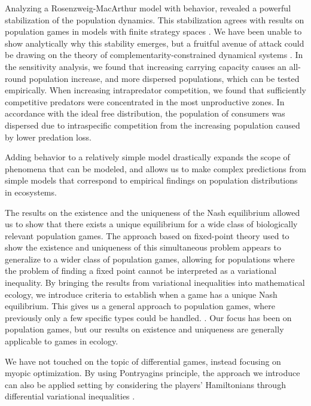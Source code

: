Analyzing a Rosenzweig-MacArthur model with behavior, revealed a powerful stabilization of the population dynamics. This stabilization agrees with results on population games in models with finite strategy spaces \citep{kvrivan2007lotka, valdovinos2010consequences}. We have been unable to show analytically why this stability emerges, but a fruitful avenue of attack could be drawing on the theory of complementarity-constrained dynamical systems \citep{adly2018variational,brogliato2020dynamical}.  In the sensitivity analysis, we found that increasing carrying capacity causes an all-round population increase, and more dispersed populations, which can be tested empirically. When increasing intrapredator competition, we found that sufficiently competitive predators were concentrated in the most unproductive zones. In accordance with the ideal free distribution, the population of consumers was dispersed due to intraspecific competition from the increasing population caused by lower predation loss.


Adding behavior to a relatively simple model drastically expands the scope of phenomena that can be modeled, and allows us to make complex predictions from simple models that correspond to empirical findings on population distributions in ecosystems.


The results on the existence and the uniqueness of the Nash equilibrium allowed us to show that there exists a unique equilibrium for a wide class of biologically relevant population games. The approach based on fixed-point theory used to show the existence and uniqueness of this simultaneous problem appears to generalize to a wider class of population games, allowing for populations where the problem of finding a fixed point cannot be interpreted as a variational inequality. By bringing the results from variational inequalities into mathematical ecology, we introduce criteria to establish when a game has a unique Nash equilibrium. This gives us a general approach to population games, where previously only a few specific types could be handled. \citep{sandholm2010population}. Our focus has been on population games, but our results on existence and uniqueness are generally applicable to games in ecology.


We have not touched on the topic of differential games, instead focusing on myopic optimization. By using Pontryagins principle, the approach we introduce can also be applied setting by considering the players' Hamiltonians through differential variational inequalities \citep{pang2008differential}.

